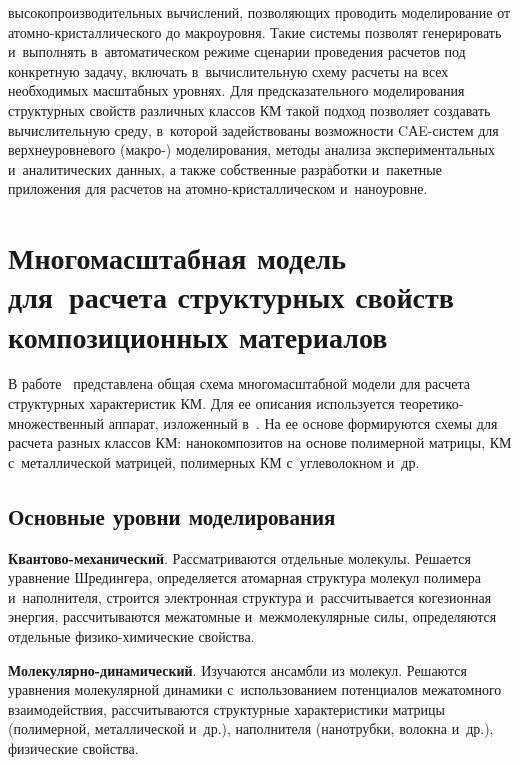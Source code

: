 \begin{multicols}{2}
высокопроизводительных вычислений, поз\-во\-ля\-ющих проводить моделирование от  
атом\-но-крис\-тал\-ли\-че\-ско\-го до мак\-ро\-уров\-ня. Такие системы \mbox{позволят} 
генерировать и~выполнять в~автоматическом режиме сценарии проведения 
расчетов под конкретную задачу, включать в~вычислительную схему расчеты на 
всех необходимых мас\-штаб\-ных уровнях. Для предсказательного моделирования 
структурных свойств различных классов КМ такой 
подход поз\-во\-ля\-ет создавать вы\-чис\-ли\-тель\-ную среду, в~которой задействованы 
возможности CАE-сис\-тем для верх\-не\-уров\-не\-во\-го (мак\-ро-) моделирования, 
методы анализа экспериментальных и~аналитических данных, а также 
собственные разработки и~пакетные приложения для расчетов на атом\-но-крис\-тал\-ли\-че\-ском и~наноуровне.

\vspace*{-9pt}

\section{Многомасштабная модель для~расчета структурных 
свойств композиционных материалов}

     В работе~\cite{2-ab} представлена общая схема многомасштабной модели 
для расчета структурных характеристик КМ. Для ее 
описания используется тео\-ре\-ти\-ко-мно\-жест\-вен\-ный аппарат, изложенный 
в~\cite{1-ab, 2-ab}. На ее основе формируются схемы для расчета разных классов 
КМ: нанокомпозитов на основе полимерной мат\-ри\-цы, 
КМ с~металлической мат\-ри\-цей, полимерных 
КМ с~углеволокном и~др.

\vspace*{-9pt}
     
     \subsection*{Основные уровни моделирования}
     
     \vspace*{-2pt}
     
     
     \textbf{Квантово-механический}. Рассматриваются отдельные молекулы. 
Решается уравнение Шредингера, определяется атомарная струк\-ту\-ра молекул 
полимера и~наполнителя, строится электронная струк\-ту\-ра и~рас\-счи\-ты\-ва\-ет\-ся 
когезионная энергия, рас\-счи\-ты\-ва\-ют\-ся меж\-атом\-ные и~меж\-мо\-ле\-ку\-ляр\-ные силы, 
определяются отдельные фи\-зи\-ко-хи\-ми\-че\-ские свойства.
     
     \textbf{Молекулярно-динамический}. Изучаются ан\-самб\-ли из молекул. 
Решаются уравнения молекулярной динамики с~использованием потенциалов 
межатомного взаимодействия, рас\-счи\-ты\-ва\-ют\-ся структурные характеристики 
мат\-ри\-цы (полимерной, металлической и~др.), наполнителя (нанотрубки, 
волокна и~др.), физические свойства. 
     

\end{multicols}
